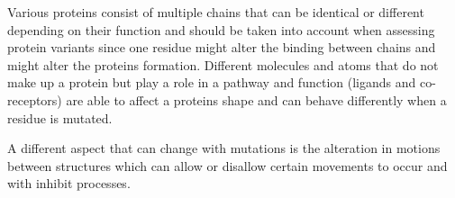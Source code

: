 	Various proteins consist of multiple chains that can be identical or different depending on their function \cite{} and should be taken into account when assessing protein variants since one residue might alter the binding between chains and might alter the proteins formation. 
	Different molecules and atoms that do not make up a protein but play a role in a pathway and function (ligands and co-receptors) are able to affect a proteins shape and can behave differently when a residue is mutated. 
	
	A different aspect that can change with mutations is the alteration in motions between structures which can allow or disallow certain movements to occur and with inhibit processes.
	
	
%	
%	


